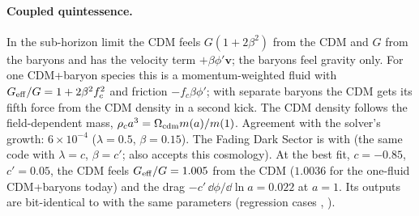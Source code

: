 \paragraph*{Coupled quintessence.} In the sub-horizon limit the CDM feels $G(1+2\beta^2)$ from the CDM and $G$ from the
baryons and has the velocity term $+\beta\phi'\bm v$; the baryons feel gravity only. For one CDM+baryon species this is
a momentum-weighted fluid with $G_{\rm eff}/G=1+2\beta^2f_c^2$ and friction $-f_c\beta\phi'$; with separate baryons the
CDM gets its fifth force from the CDM density in a second kick. The CDM density follows the field-dependent mass,
$\rho_ca^3=\Omega_{\rm cdm}m(a)/m(1)$. Agreement with the solver's growth: $6\times10^{-4}$ ($\lambda=0.5$, $\beta=0.15$).
The Fading Dark Sector \cite{ObiedVafaWu2026} is  with  (the same code with $\lambda=c$, $\beta=c'$;  also accepts this
cosmology). At the best fit, $c=-0.85$, $c'=0.05$, the CDM feels $G_{\rm eff}/G=1.005$ from the CDM ($1.0036$ for the
one-fluid CDM+baryons today) and the drag $-c'\,\dd\phi/\dd\ln a=0.022$ at $a=1$. Its outputs are bit-identical to
 with the same parameters (regression cases ,
).

